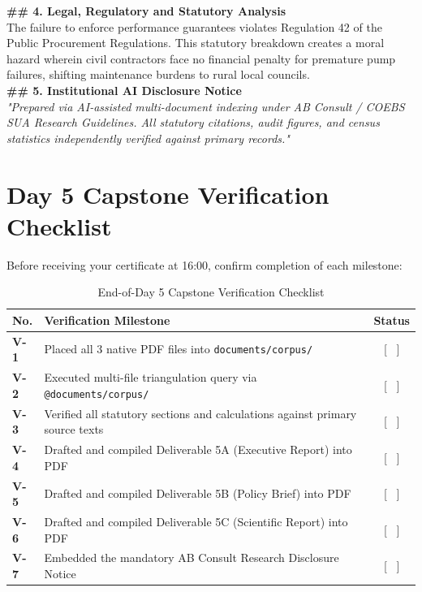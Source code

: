 \documentclass[11pt, a4paper]{report}
\begin{document}
\begin{tcolorbox}[colback=lightgrey, colframe=bordergrey, title=\textbf{Deliverable 5C Preview: \texttt{Report3\_Scientific\_Water\_Oversight.md}}]
\textbf{\#\# 4. Legal, Regulatory and Statutory Analysis}\\
The failure to enforce performance guarantees violates Regulation 42 of the Public Procurement Regulations. This statutory breakdown creates a moral hazard wherein civil contractors face no financial penalty for premature pump failures, shifting maintenance burdens to rural local councils.\\[0.2cm]
\textbf{\#\# 5. Institutional AI Disclosure Notice}\\
\textit{"Prepared via AI-assisted multi-document indexing under AB Consult / COEBS SUA Research Guidelines. All statutory citations, audit figures, and census statistics independently verified against primary records."}
\end{tcolorbox}

\section{Day 5 Capstone Verification Checklist}
Before receiving your certificate at 16:00, confirm completion of each milestone:

\begin{table}[htbp]
\centering
\caption{End-of-Day 5 Capstone Verification Checklist}
\vspace{0.2cm}
\begin{tabular}{@{}>{\bfseries}p{1.2cm}p{10cm}c@{}}
\toprule
No. & Verification Milestone & Status \\
\midrule
V-1 & Placed all 3 native PDF files into \texttt{documents/corpus/} & [ \ ] \\
V-2 & Executed multi-file triangulation query via \texttt{@documents/corpus/} & [ \ ] \\
V-3 & Verified all statutory sections and calculations against primary source texts & [ \ ] \\
V-4 & Drafted and compiled Deliverable 5A (Executive Report) into PDF & [ \ ] \\
V-5 & Drafted and compiled Deliverable 5B (Policy Brief) into PDF & [ \ ] \\
V-6 & Drafted and compiled Deliverable 5C (Scientific Report) into PDF & [ \ ] \\
V-7 & Embedded the mandatory AB Consult Research Disclosure Notice & [ \ ] \\
\bottomrule
\end{tabular}
\end{table}

\newpage
\end{document}
